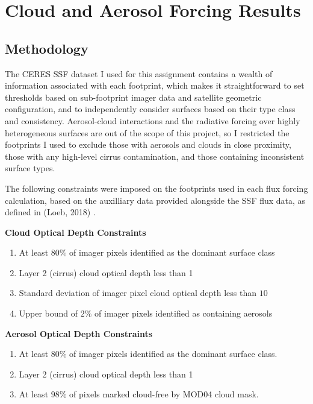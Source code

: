 \documentclass[12pt]{article}
\begin{document}
    \section{Cloud and Aerosol Forcing Results}

    \subsection{Methodology}

    The CERES SSF dataset I used for this assignment contains a wealth of information associated with each footprint, which makes it straightforward to set thresholds based on sub-footprint imager data and satellite geometric configuration, and to independently consider surfaces based on their type class and consistency. Aerosol-cloud interactions and the radiative forcing over highly heterogeneous surfaces are out of the scope of this project, so I restricted the footprints I used to exclude those with aerosols and clouds in close proximity, those with any high-level cirrus contamination, and those containing inconsistent surface types.

    The following constraints were imposed on the footprints used in each flux forcing calculation, based on the auxilliary data provided alongside the SSF flux data, as defined in (Loeb, 2018) \cite{loeb_503_2018}.

    \vspace{1em}
    \noindent
    \textbf{Cloud Optical Depth Constraints}
    \vspace{-1em}
    \begin{enumerate}[itemsep=0pt, parsep=0pt, before=\setlength{\baselineskip}{6mm}]
        \item At least $80\%$ of imager pixels identified as the dominant surface class
        \item Layer 2 (cirrus) cloud optical depth less than 1
        \item Standard deviation of imager pixel cloud optical depth less than $10$
        \item Upper bound of $2\%$ of imager pixels identified as containing aerosols
    \end{enumerate}

    \noindent
    \textbf{Aerosol Optical Depth Constraints}
    \vspace{-1em}
    \begin{enumerate}[itemsep=0pt, parsep=0pt, before=\setlength{\baselineskip}{6mm}]
        \item At least $80\%$ of imager pixels identified as the dominant surface class.
        \item Layer 2 (cirrus) cloud optical depth less than 1
        \item At least $98\%$ of pixels marked cloud-free by MOD04 cloud mask.
    \end{enumerate}
\end{document}
